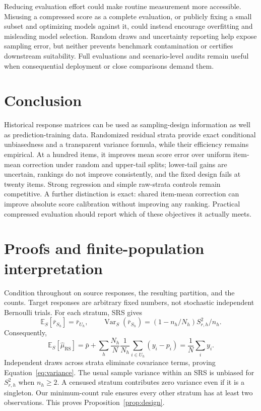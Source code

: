 \documentclass{article}
\newcommand{\E}{\mathbb{E}}
\newcommand{\Var}{\operatorname{Var}}
\newcommand{\rrs}{\mathrm{RS}}
\begin{document}
Reducing evaluation effort could make routine measurement more accessible. Misusing a compressed score as a complete evaluation, or publicly fixing a small subset and optimizing models against it, could instead encourage overfitting and misleading model selection. Random draws and uncertainty reporting help expose sampling error, but neither prevents benchmark contamination or certifies downstream suitability. Full evaluations and scenario-level audits remain useful when consequential deployment or close comparisons demand them.

\section{Conclusion}
Historical response matrices can be used as sampling-design information as well as prediction-training data. Randomized residual strata provide exact conditional unbiasedness and a transparent variance formula, while their efficiency remains empirical. At a hundred items, it improves mean score error over uniform item-mean correction under random and upper-tail splits; lower-tail gains are uncertain, rankings do not improve consistently, and the fixed design fails at twenty items. Strong regression and simple raw-strata controls remain competitive. A further distinction is exact: shared item-mean correction can improve absolute score calibration without improving any ranking. Practical compressed evaluation should report which of these objectives it actually meets.

\clearpage



\clearpage
\appendix
\section{Proofs and finite-population interpretation}
\label{app:proofs}
Condition throughout on source responses, the resulting partition, and the counts. Target responses are arbitrary fixed numbers, not stochastic independent Bernoulli trials. For each stratum, SRS gives
\begin{equation}
\E_S[\bar r_{S_h}]=\bar r_{U_h},\qquad
\Var_S(\bar r_{S_h})=(1-n_h/N_h)S_{r,h}^2/n_h.
\end{equation}
Consequently,
\begin{equation}
\E_S[\widehat\mu_{\rrs}]=\bar p+\sum_h\frac{N_h}{N}\frac1{N_h}\sum_{i\in U_h}(y_i-p_i)
=\frac1N\sum_i y_i.
\end{equation}
Independent draws across strata eliminate covariance terms, proving Equation~\eqref{eq:variance}. The usual sample variance within an SRS is unbiased for $S_{r,h}^2$ when $n_h\geq2$. A censused stratum contributes zero variance even if it is a singleton. Our minimum-count rule ensures every other stratum has at least two observations. This proves Proposition~\ref{prop:design}.
\end{document}
